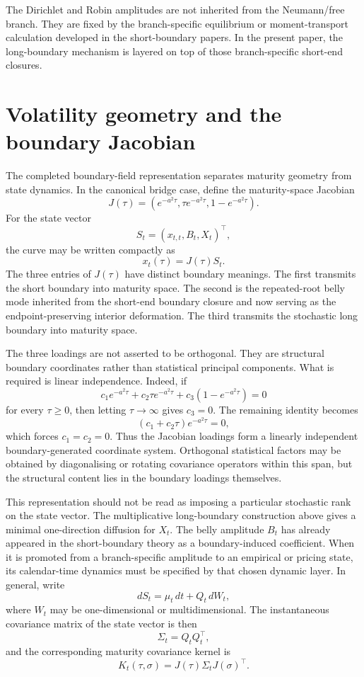 \documentclass[11pt]{article}
\begin{document}
The Dirichlet and Robin amplitudes are not inherited from the Neumann/free branch. They are fixed by the branch-specific equilibrium or moment-transport calculation developed in the short-boundary papers. In the present paper, the long-boundary mechanism is layered on top of those branch-specific short-end closures.


\section{Volatility geometry and the boundary Jacobian}

The completed boundary-field representation separates maturity geometry from state dynamics. In the canonical bridge case, define the maturity-space Jacobian
\[
J(\tau)
=
\left(
 e^{-a^2\tau},
 \tau e^{-a^2\tau},
 1-e^{-a^2\tau}
\right).
\]
For the state vector
\[
S_t=
\left(x_{t,t},B_t,X_t\right)^{\top},
\]
the curve may be written compactly as
\[
x_t(\tau)=J(\tau)S_t.
\]
The three entries of \(J(\tau)\) have distinct boundary meanings. The first transmits the short boundary into maturity space. The second is the repeated-root belly mode inherited from the short-end boundary closure and now serving as the endpoint-preserving interior deformation. The third transmits the stochastic long boundary into maturity space.

The three loadings are not asserted to be orthogonal. They are structural boundary coordinates rather than statistical principal components. What is required is linear independence. Indeed, if
\[
c_1e^{-a^2\tau}+c_2\tau e^{-a^2\tau}+c_3(1-e^{-a^2\tau})=0
\]
for every \(\tau\geq0\), then letting \(\tau\to\infty\) gives \(c_3=0\). The remaining identity becomes
\[
(c_1+c_2\tau)e^{-a^2\tau}=0,
\]
which forces \(c_1=c_2=0\). Thus the Jacobian loadings form a linearly independent boundary-generated coordinate system. Orthogonal statistical factors may be obtained by diagonalising or rotating covariance operators within this span, but the structural content lies in the boundary loadings themselves.

This representation should not be read as imposing a particular stochastic rank on the state vector. The multiplicative long-boundary construction above gives a minimal one-direction diffusion for \(X_t\). The belly amplitude \(B_t\) has already appeared in the short-boundary theory as a boundary-induced coefficient. When it is promoted from a branch-specific amplitude to an empirical or pricing state, its calendar-time dynamics must be specified by that chosen dynamic layer. In general, write
\[
dS_t=\mu_t\,dt+Q_t\,dW_t,
\]
where \(W_t\) may be one-dimensional or multidimensional. The instantaneous covariance matrix of the state vector is then
\[
\Sigma_t=Q_tQ_t^{\top},
\]
and the corresponding maturity covariance kernel is
\[
K_t(\tau,\sigma)
=
J(\tau)\Sigma_tJ(\sigma)^{\top}.
\]
\end{document}
